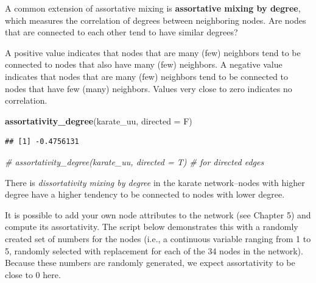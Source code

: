 \documentclass[
]{book}
\newenvironment{Shaded}{\begin{snugshade}}{\end{snugshade}}
\newcommand{\AttributeTok}[1]{\textcolor[rgb]{0.13,0.29,0.53}{#1}}
\newcommand{\CommentTok}[1]{\textcolor[rgb]{0.56,0.35,0.01}{\textit{#1}}}
\newcommand{\DecValTok}[1]{\textcolor[rgb]{0.00,0.00,0.81}{#1}}
\newcommand{\FunctionTok}[1]{\textcolor[rgb]{0.13,0.29,0.53}{\textbf{#1}}}
\newcommand{\NormalTok}[1]{#1}
\newcommand{\OtherTok}[1]{\textcolor[rgb]{0.56,0.35,0.01}{#1}}
\newcommand{\SpecialCharTok}[1]{\textcolor[rgb]{0.81,0.36,0.00}{\textbf{#1}}}
\begin{document}
A common extension of assortative mixing is \textbf{assortative mixing by degree}, which measures the correlation of degrees between neighboring nodes. Are nodes that are connected to each other tend to have similar degrees?

A positive value indicates that nodes that are many (few) neighbors tend to be connected to nodes that also have many (few) neighbors. A negative value indicates that nodes that are many (few) neighbors tend to be connected to nodes that have few (many) neighbors. Values very close to zero indicates no correlation.

\begin{Shaded}
\begin{Highlighting}[]
\FunctionTok{assortativity\_degree}\NormalTok{(karate\_uu, }\AttributeTok{directed =}\NormalTok{ F)}
\end{Highlighting}
\end{Shaded}

\begin{verbatim}
## [1] -0.4756131
\end{verbatim}

\begin{Shaded}
\begin{Highlighting}[]
\CommentTok{\# assortativity\_degree(karate\_uu, directed = T) \# for directed edges }
\end{Highlighting}
\end{Shaded}

There is \emph{dissortativity mixing by degree} in the karate network--nodes with higher degree have a higher tendency to be connected to nodes with lower degree.

It is possible to add your own node attributes to the network (see Chapter 5) and compute its assortativity. The script below demonstrates this with a randomly created set of numbers for the nodes (i.e., a continuous variable ranging from 1 to 5, randomly selected with replacement for each of the 34 nodes in the network). Because these numbers are randomly generated, we expect assortativity to be close to 0 here.

\begin{Shaded}
\end{Shaded}
\end{document}
